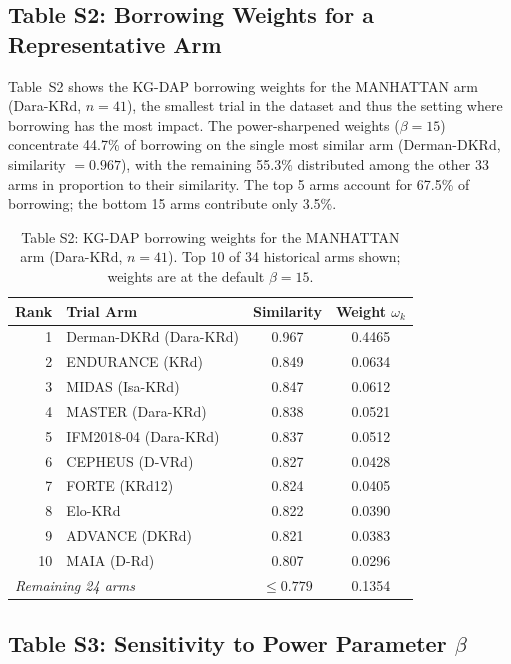 \documentclass[12pt]{article}
\begin{document}
\subsection*{Table S2: Borrowing Weights for a Representative Arm}

Table~S2 shows the KG-DAP borrowing weights for the MANHATTAN arm (Dara-KRd, $n = 41$), the smallest trial in the dataset and thus the setting where borrowing has the most impact. The power-sharpened weights ($\beta = 15$) concentrate 44.7\% of borrowing on the single most similar arm (Derman-DKRd, similarity $= 0.967$), with the remaining 55.3\% distributed among the other 33 arms in proportion to their similarity. The top 5 arms account for 67.5\% of borrowing; the bottom 15 arms contribute only 3.5\%.

\begin{table}[h]
\centering
\caption*{Table S2: KG-DAP borrowing weights for the MANHATTAN arm (Dara-KRd, $n = 41$). Top 10 of 34 historical arms shown; weights are at the default $\beta = 15$.}
\begin{tabular}{rlcc}
\toprule
Rank & Trial Arm & Similarity & Weight $\omega_k$ \\
\midrule
1 & Derman-DKRd (Dara-KRd) & 0.967 & 0.4465 \\
2 & ENDURANCE (KRd) & 0.849 & 0.0634 \\
3 & MIDAS (Isa-KRd) & 0.847 & 0.0612 \\
4 & MASTER (Dara-KRd) & 0.838 & 0.0521 \\
5 & IFM2018-04 (Dara-KRd) & 0.837 & 0.0512 \\
6 & CEPHEUS (D-VRd) & 0.827 & 0.0428 \\
7 & FORTE (KRd12) & 0.824 & 0.0405 \\
8 & Elo-KRd & 0.822 & 0.0390 \\
9 & ADVANCE (DKRd) & 0.821 & 0.0383 \\
10 & MAIA (D-Rd) & 0.807 & 0.0296 \\
\midrule
\multicolumn{2}{l}{\textit{Remaining 24 arms}} & $\leq 0.779$ & 0.1354 \\
\bottomrule
\end{tabular}
\end{table}

\subsection*{Table S3: Sensitivity to Power Parameter $\beta$}
\end{document}
